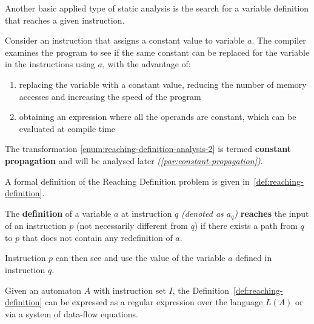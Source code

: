 \documentclass[english]{article}
\begin{document}
Another basic applied type of static analysis is the search for a variable definition that reaches a given instruction.

Consider an instruction that assigns a constant value to variable \(a\).
The compiler examines the program to see if the same constant can be replaced for the variable in the instructions using \(a\), with the advantage of:

\begin{enumerate}[label=\arabic*., ref=\arabic*.]
  \item\label{enum:reaching-definition-analysis-1} replacing the variable with a constant value, reducing the number of memory accesses and increasing the speed of the program
  \item\label{enum:reaching-definition-analysis-2} obtaining an expression where all the operands are constant, which can be evaluated at compile time
\end{enumerate}

The transformation \ref{enum:reaching-definition-analysis-2} is termed \textbf{constant propagation} and will be analysed later \textit{(\ref{par:constant-propagation})}.

A formal definition of the Reaching Definition problem is given in~\ref{def:reaching-definition}.

\begin{definition}
  \label{def:reaching-definition}
  The \textbf{definition} of a variable \(a\) at instruction \(q\) \textit{(denoted as \(a_q\))} \textbf{reaches} the input of an instruction \(p\) (not necessarily different from \(q\)) if there exists a path from \(q\) to \(p\) that does not contain any redefinition of \(a\).
\end{definition}

Instruction \(p\) can then see and use the value of the variable \(a\) defined in instruction \(q\).

Given an automaton \(A\) with instruction set \(I\), the Definition~\ref{def:reaching-definition} can be expressed as a regular expression over the language \(L(A)\) or via a system of data-flow equations.
\end{document}
